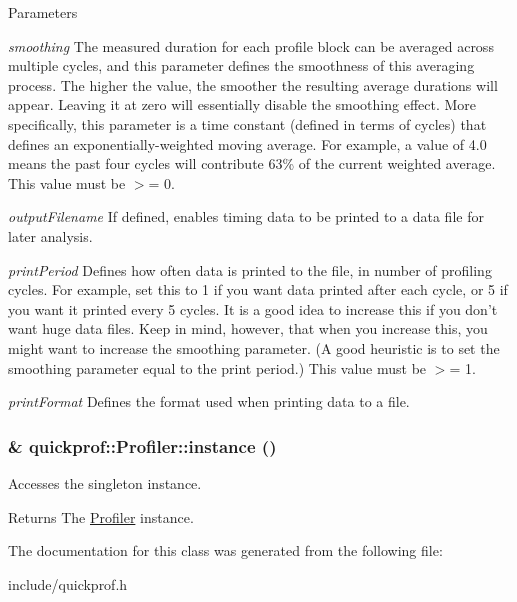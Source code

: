 \begin{DoxyParams}{Parameters}
\item[{\em smoothing}]The measured duration for each profile block can be averaged across multiple cycles, and this parameter defines the smoothness of this averaging process. The higher the value, the smoother the resulting average durations will appear. Leaving it at zero will essentially disable the smoothing effect. More specifically, this parameter is a time constant (defined in terms of cycles) that defines an exponentially-\/weighted moving average. For example, a value of 4.0 means the past four cycles will contribute 63\% of the current weighted average. This value must be $>$= 0. \item[{\em outputFilename}]If defined, enables timing data to be printed to a data file for later analysis. \item[{\em printPeriod}]Defines how often data is printed to the file, in number of profiling cycles. For example, set this to 1 if you want data printed after each cycle, or 5 if you want it printed every 5 cycles. It is a good idea to increase this if you don't want huge data files. Keep in mind, however, that when you increase this, you might want to increase the smoothing parameter. (A good heuristic is to set the smoothing parameter equal to the print period.) This value must be $>$= 1. \item[{\em printFormat}]Defines the format used when printing data to a file. \end{DoxyParams}
\hypertarget{classquickprof_1_1_profiler_a9d221771f0638595966bda3585ebe3fa}{
\subsubsection[{instance}]{ \& quickprof::Profiler::instance ()}}
\label{classquickprof_1_1_profiler_a9d221771f0638595966bda3585ebe3fa}
Accesses the singleton instance.

\begin{DoxyReturn}{Returns}
The \hyperlink{classquickprof_1_1_profiler}{Profiler} instance. 
\end{DoxyReturn}


The documentation for this class was generated from the following file:\begin{DoxyCompactItemize}
\item 
include/quickprof.h\end{DoxyCompactItemize}
